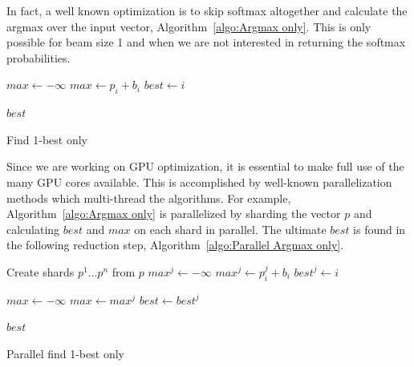 \documentclass[11pt,a4paper]{article}
\begin{document}
In fact, a well known optimization is to skip softmax altogether and calculate the argmax over the input vector, Algorithm~\ref{algo:Argmax only}. This is only possible for beam size 1 and when we are not interested in returning the softmax probabilities.

\begin{algorithm}
\begin{algorithmic}

\State $max \gets - \infty$ 
    \State $max \gets p_i + b_i$
    \State $best \gets i$
  \EndIf
\EndFor

\Return $best$ 

\EndProcedure

\end{algorithmic}
\caption{Find 1-best only}
\label{algo:Argmax only}
\end{algorithm}

Since we are working on GPU optimization, it is essential to make full use of the many GPU cores available. This is accomplished by well-known parallelization methods which multi-thread the algorithms. For example, Algorithm~\ref{algo:Argmax only} is parallelized by sharding the vector $p$ and calculating $best$ and $max$ on each shard in parallel. The ultimate $best$ is found in the following reduction step, Algorithm~\ref{algo:Parallel Argmax only}.

\begin{algorithm}
\begin{algorithmic}

\State Create shards ${p^1...p^n}$ from $p$
  \State $max^j \gets - \infty$ 
      \State $max^j \gets p_i^j + b_i$
      \State $best^j \gets i$
    \EndIf
  \EndFor

\EndParFor

\State $max \gets - \infty$ 
    \State $max \gets max^j$
    \State $best \gets best^j$
  \EndIf
\EndFor


\Return $best$ 

\EndProcedure

\end{algorithmic}
\caption{Parallel find 1-best only}
\label{algo:Parallel Argmax only}
\end{algorithm}
\end{document}

